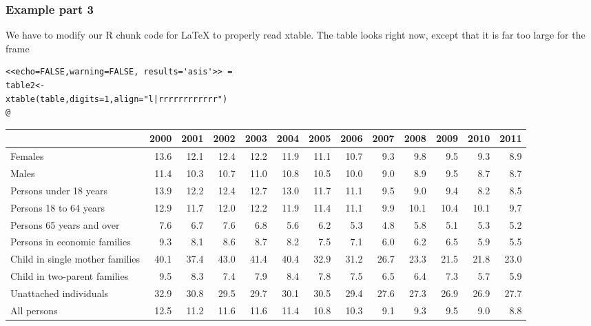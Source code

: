 \documentclass[nogin]{beamer}\usepackage[]{graphicx}\usepackage[]{color}
\begin{document}
\begin{frame}[fragile]
\frametitle{Example part 3}
\small
We have to modify our R chunk code for LaTeX to properly read xtable. The table looks right now, except that it is far too large for the frame
\begin{verbatim}
<<echo=FALSE,warning=FALSE, results='asis'>> =
table2<-
xtable(table,digits=1,align="l|rrrrrrrrrrrr")
@
\end{verbatim}
\begin{table}[ht]
\centering
\begin{tabular}{l|rrrrrrrrrrrr}
  \hline
 & 2000 & 2001 & 2002 & 2003 & 2004 & 2005 & 2006 & 2007 & 2008 & 2009 & 2010 & 2011 \\ 
  \hline
Females & 13.6 & 12.1 & 12.4 & 12.2 & 11.9 & 11.1 & 10.7 & 9.3 & 9.8 & 9.5 & 9.3 & 8.9 \\ 
  Males & 11.4 & 10.3 & 10.7 & 11.0 & 10.8 & 10.5 & 10.0 & 9.0 & 8.9 & 9.5 & 8.7 & 8.7 \\ 
  Persons under 18 years & 13.9 & 12.2 & 12.4 & 12.7 & 13.0 & 11.7 & 11.1 & 9.5 & 9.0 & 9.4 & 8.2 & 8.5 \\ 
  Persons 18 to 64 years & 12.9 & 11.7 & 12.0 & 12.2 & 11.9 & 11.4 & 11.1 & 9.9 & 10.1 & 10.4 & 10.1 & 9.7 \\ 
  Persons 65 years and over & 7.6 & 6.7 & 7.6 & 6.8 & 5.6 & 6.2 & 5.3 & 4.8 & 5.8 & 5.1 & 5.3 & 5.2 \\ 
  Persons in economic families & 9.3 & 8.1 & 8.6 & 8.7 & 8.2 & 7.5 & 7.1 & 6.0 & 6.2 & 6.5 & 5.9 & 5.5 \\ 
  Child in single mother families & 40.1 & 37.4 & 43.0 & 41.4 & 40.4 & 32.9 & 31.2 & 26.7 & 23.3 & 21.5 & 21.8 & 23.0 \\ 
  Child in two-parent families & 9.5 & 8.3 & 7.4 & 7.9 & 8.4 & 7.8 & 7.5 & 6.5 & 6.4 & 7.3 & 5.7 & 5.9 \\ 
  Unattached individuals & 32.9 & 30.8 & 29.5 & 29.7 & 30.1 & 30.5 & 29.4 & 27.6 & 27.3 & 26.9 & 26.9 & 27.7 \\ 
  All persons & 12.5 & 11.2 & 11.6 & 11.6 & 11.4 & 10.8 & 10.3 & 9.1 & 9.3 & 9.5 & 9.0 & 8.8 \\ 
   \hline
\end{tabular}
\end{table}


\end{frame}
\end{document}
